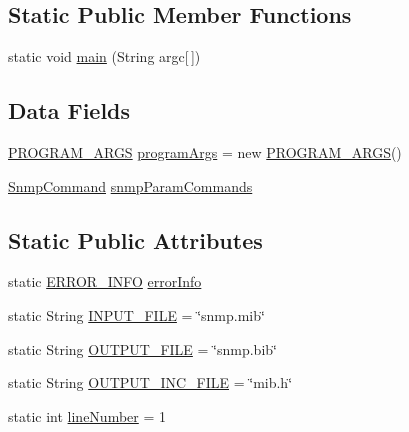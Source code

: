 \subsection*{Static Public Member Functions}
\begin{DoxyCompactItemize}
\item 
static void \hyperlink{classmib2bib_1_1mib2bib_a11ce27e5e4508b5be64c29876a1d5fae}{main} (String argc\mbox{[}$\,$\mbox{]})
\end{DoxyCompactItemize}
\subsection*{Data Fields}
\begin{DoxyCompactItemize}
\item 
\hyperlink{classmib2bib_1_1mib2bib_1_1_p_r_o_g_r_a_m___a_r_g_s}{P\+R\+O\+G\+R\+A\+M\+\_\+\+A\+R\+G\+S} \hyperlink{classmib2bib_1_1mib2bib_a7368cf1f2e677cdf37b1daf2f907f520}{program\+Args} = new \hyperlink{classmib2bib_1_1mib2bib_1_1_p_r_o_g_r_a_m___a_r_g_s}{P\+R\+O\+G\+R\+A\+M\+\_\+\+A\+R\+G\+S}()
\item 
\hyperlink{classmib2bib_1_1_snmp_command}{Snmp\+Command} \hyperlink{classmib2bib_1_1mib2bib_abc4c23127ec665cd09c0e0103895e42a}{snmp\+Param\+Commands}
\end{DoxyCompactItemize}
\subsection*{Static Public Attributes}
\begin{DoxyCompactItemize}
\item 
static \hyperlink{classmib2bib_1_1mib2bib_1_1_e_r_r_o_r___i_n_f_o}{E\+R\+R\+O\+R\+\_\+\+I\+N\+F\+O} \hyperlink{classmib2bib_1_1mib2bib_aa4c971316b8cb6e0b77d1f82895b9e38}{error\+Info}
\item 
static String \hyperlink{classmib2bib_1_1mib2bib_a887665ab9e9d05b5aaae37f029f9a129}{I\+N\+P\+U\+T\+\_\+\+F\+I\+L\+E} = \char`\"{}snmp.\+mib\char`\"{}
\item 
static String \hyperlink{classmib2bib_1_1mib2bib_a5c5d40d609cc4e4a4dc9d20f74f769ad}{O\+U\+T\+P\+U\+T\+\_\+\+F\+I\+L\+E} = \char`\"{}snmp.\+bib\char`\"{}
\item 
static String \hyperlink{classmib2bib_1_1mib2bib_a9ddaabd0ae87bd3583e9a29d22bc6be5}{O\+U\+T\+P\+U\+T\+\_\+\+I\+N\+C\+\_\+\+F\+I\+L\+E} = \char`\"{}mib.\+h\char`\"{}
\item 
static int \hyperlink{classmib2bib_1_1mib2bib_a44bf2f6ee91a35522c07c779325d3ef0}{line\+Number} = 1
\end{DoxyCompactItemize}


